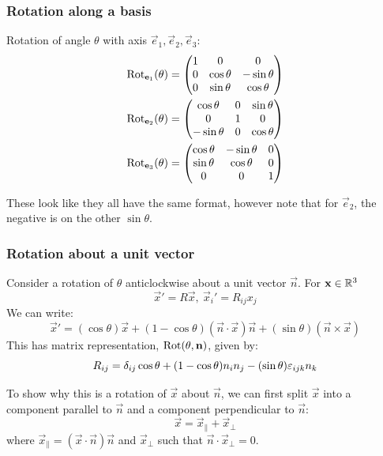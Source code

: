 \documentclass[../main.tex]{subfiles}
\begin{document}
\subsubsection{Rotation along a basis}
Rotation of angle $\theta$ with axis $\vec{e}_1, \vec{e}_2, \vec{e}_3$:
\begin{align*}
  \operatorname{Rot}_{\mathbf{\bm{e}}_1}(\theta) &= \begin{pmatrix}
  1 & 0 & 0 \\
  0 & \cos \theta & -\sin \theta \\
  0 & \sin \theta & \cos \theta \\
  \end{pmatrix} \\
  \operatorname{Rot}_{\mathbf{\bm{e}}_2}(\theta) &= \begin{pmatrix}
  \cos \theta & 0 & \sin \theta \\
  0 & 1 & 0 \\
  - \sin \theta & 0 & \cos \theta \\
  \end{pmatrix} \\
  \operatorname{Rot}_{\mathbf{\bm{e}}_3}(\theta) &= \begin{pmatrix}
  \cos \theta & -\sin \theta & 0 \\
  \sin \theta & \cos \theta & 0 \\
  0 & 0 & 1 \\
  \end{pmatrix}
\end{align*}
\begin{remark}[Warning]
  These look like they all have the same format, however note that for $\vec{e}_2$, the negative is on the other $\sin \theta$.
\end{remark}
\subsubsection{Rotation about a unit vector}
Consider a rotation of $\theta$ anticlockwise about a unit vector $\vec{n}$.
For $\mathbf{\bm{x}} \in \mathbb{R}^{3}$
\[
  \vec{x}' = R\vec{x},\ \vec{x}_i' = R_{i j}x_j
\]
We can write:
\[
  \vec{x}' = (\cos \theta)\vec{x} + (1 - \cos \theta)(\vec{n} \cdot \vec{x})\vec{n} + (\sin \theta)(\vec{n} \times \vec{x})
\]
This has matrix representation, $\operatorname{Rot}(\theta, \mathbf{\bm{n}})$, given by:
\[
  R_{i j} = \delta_{i j}\cos\theta + (1 - \cos \theta)n_in_j - (\sin \theta)\varepsilon_{i j k}n_k
\]

To show why this is a rotation of $\vec{x}$ about $\vec{n}$, we can first split $\vec{x}$ into a component parallel to $\vec{n}$ and a component perpendicular to $\vec{n}$:
\[
  \vec{x} = \vec{x}_{\parallel} + \vec{x}_{\perp}
\]
where $\vec{x}_{\parallel} = (\vec{x} \cdot \vec{n})\vec{n}$ and $\vec{x}_{\perp}$ such that $\vec{n} \cdot \vec{x}_{\perp} = 0$.
\end{document}
